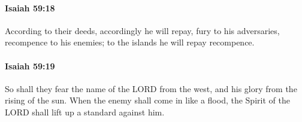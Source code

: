 		\paragraph{Isaiah 59:18} %
			\label{ISAIAH-59-18}

			According to their deeds, accordingly he will repay, fury to his adversaries, recompence to his enemies; to the islands he will repay recompence.


		\paragraph{Isaiah 59:19} %
			\label{ISAIAH-59-19}

			So shall they fear the name of the LORD from the west, and his glory from the rising of the sun. When the enemy shall come in like a flood, the Spirit of the LORD shall lift up a standard against him.


